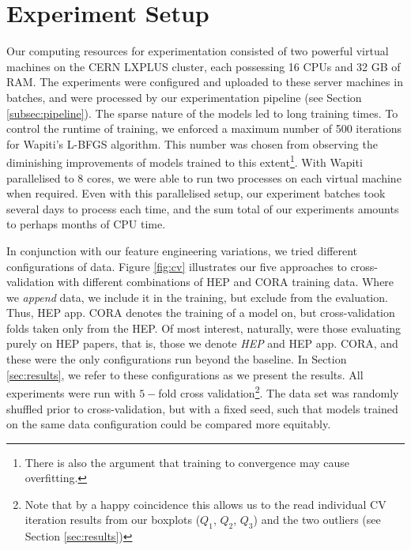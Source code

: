 \section{Experiment Setup}
\label{sec:experimentsetup}

Our computing resources for experimentation consisted of two powerful virtual machines on the CERN LXPLUS cluster, each possessing 16 CPUs and 32 GB of RAM. The experiments were configured and uploaded to these server machines in batches, and were processed by our experimentation pipeline (see Section \ref{subsec:pipeline}). The sparse nature of the models led to long training times. To control the runtime of training, we enforced a maximum number of 500 iterations for Wapiti's L-BFGS algorithm. This number was chosen from observing the diminishing improvements of models trained to this extent\footnote{There is also the argument that training to convergence may cause overfitting.}. With Wapiti parallelised to 8 cores, we were able to run two processes on each virtual machine when required. Even with this parallelised setup, our experiment batches took several days to process each time, and the sum total of our experiments amounts to perhaps months of CPU time.

In conjunction with our feature engineering variations, we tried different configurations of data. Figure \ref{fig:cv} illustrates our five approaches to cross-validation with different combinations of HEP and CORA training data. Where we \emph{append} data, we include it in the training, but exclude from the evaluation. Thus, HEP app. CORA denotes the training of a model on, but cross-validation folds taken only from the HEP. Of most interest, naturally, were those evaluating purely on HEP papers, that is, those we denote \emph{HEP} and {HEP app. CORA}, and these were the only configurations run beyond the baseline. In Section \ref{sec:results}, we refer to these configurations as we present the results. All experiments were run with $5-$fold cross validation\footnote{Note that by a happy coincidence this allows us to the read individual CV iteration results from our boxplots ($Q_1$, $Q_2$, $Q_3$) and the two outliers (see Section \ref{sec:results})}. The data set was randomly shuffled prior to cross-validation, but with a fixed seed, such that models trained on the same data configuration could be compared more equitably.

